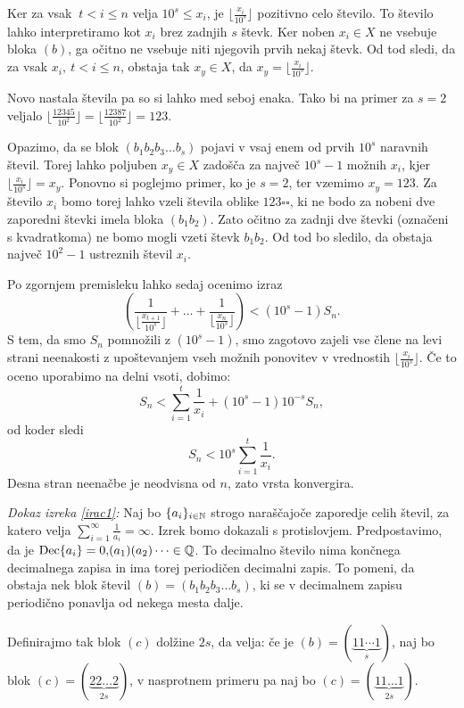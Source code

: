 \documentclass[twoside,11pt]{article}
\begin{document}
Ker za vsak $\ t < i \leq n$ velja $10^s \leq x_i$, je $\lfloor \frac{x_i}{10^s} \rfloor$ pozitivno celo število.
To število lahko interpretiramo kot $x_i$ brez zadnjih $s$ števk. 
Ker noben $x_i \in X$ ne vsebuje bloka $(b)$, 
ga očitno ne vsebuje niti njegovih prvih nekaj števk. 
Od tod sledi, da za vsak $x_i, \ t < i \leq n$, obstaja tak $x_y \in X$, da $ x_y = \lfloor \frac{x_i}{10^s} \rfloor$.

Novo nastala števila pa so si lahko med seboj enaka. Tako bi na primer za $s=2$ veljalo 
$ \lfloor\frac{12345}{10^2}\rfloor = \lfloor \frac{12387}{10^2}\rfloor = 123$.

Opazimo, da se blok $(b_1b_2b_3 \dots b_s)$ pojavi v vsaj enem od prvih $10^s$ naravnih števil.
Torej lahko poljuben $x_y \in X$ zadošča za največ $10^s - 1$ možnih $x_i$, kjer $\lfloor \frac{x_i}{10^s} \rfloor = x_y$.
%
Ponovno si poglejmo primer, ko je $s=2$, ter vzemimo $x_y = 123$. Za število $x_i$ bomo torej lahko vzeli števila oblike $123 \square \square$,
ki ne bodo za nobeni dve zaporedni števki imela bloka $(b_1b_2)$. 
Zato očitno za zadnji dve števki (označeni s kvadratkoma) ne bomo mogli vzeti števk $b_1b_2$. 
Od tod bo sledilo, da obstaja največ $10^2 - 1$ ustreznih števil $x_i$.

Po zgornjem premisleku lahko sedaj ocenimo izraz 
\[(\frac{1}{ \lfloor\frac{x_{t + 1}}{10^s}\rfloor} + \dots + \frac{1}{\lfloor\frac{x_n}{10^s}\rfloor}) < (10^s - 1)S_n.\]
S tem, da smo $S_n$ pomnožili z $(10^s - 1)$, smo zagotovo zajeli vse člene na levi strani neenakosti
z upoštevanjem vseh možnih ponovitev v vrednostih $\lfloor\frac{x_i}{10^s}\rfloor$.
Če to oceno uporabimo na delni vsoti, dobimo:
\[
    S_n < \sum_{i=1}^t \frac{1}{x_i} + (10^s - 1)10^{-s}S_n,
\] 
od koder sledi
\[
    S_n < 10^s \sum_{i=1}^t \frac{1}{x_i}.
\]
Desna stran neenačbe je neodvisna od $n$, zato vrsta konvergira.
\QED

\noindent
{\em Dokaz izreka \ref{irac1}:\/} Naj bo $\{a_i\}_{i\in \mathbb{N}}$ strogo naraščajoče zaporedje
celih števil, za katero velja $\sum_{i=1}^{\infty}\frac{1}{a_i} = \infty$. Izrek bomo dokazali
s protislovjem. Predpostavimo, da je $\text{Dec}\{a_i\} = 0{,}(a_1)(a_2) \dots \in \mathbb{Q}$. 
To decimalno
število nima končnega decimalnega zapisa in ima torej periodičen decimalni zapis.
To pomeni, da obstaja nek blok števil $(b) = (b_1b_2b_3 \dots b_s)$,
ki se v decimalnem zapisu periodično ponavlja od nekega mesta dalje. 

Definirajmo tak blok $(c)$ dolžine $2s$, da velja: 
če je $(b) = (\underbrace{11 \cdots 1}_{s})$, naj bo blok $(c) = (\underbrace{22\dots 2}_{2s})$, 
v nasprotnem primeru pa naj bo $(c) = (\underbrace{11\dots 1}_{2s})$.
\end{document}
